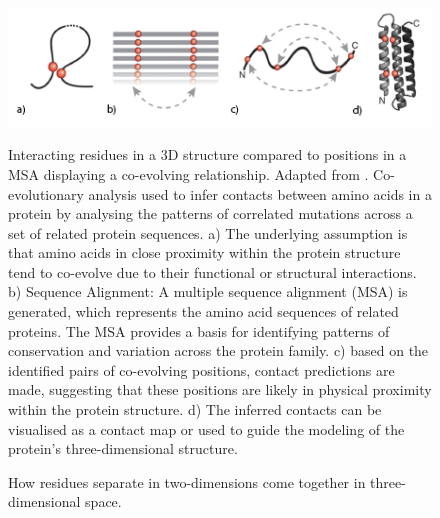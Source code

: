 \begin{figure}[th!]
    \centering
    \includegraphics[width=\textwidth]{introduction/contacts.png}
    \caption{How residues separate in two-dimensions come together in three-dimensional space. }
    \label{fig:contacts}
    \small
    Interacting residues in a 3D structure compared to positions in a MSA displaying a co-evolving relationship. Adapted from \cite{Simkovic2017}.
    Co-evolutionary analysis used to infer contacts between amino acids in a protein by analysing the patterns of correlated mutations across a set of related protein sequences. a) The underlying assumption is that amino acids in close proximity within the protein structure tend to co-evolve due to their functional or structural interactions. b) Sequence Alignment: A multiple sequence alignment (MSA) is generated, which represents the amino acid sequences of related proteins. The MSA provides a basis for identifying patterns of conservation and variation across the protein family. c) based on the identified pairs of co-evolving positions, contact predictions are made, suggesting that these positions are likely in physical proximity within the protein structure. d) The inferred contacts can be visualised as a contact map or used to guide the modeling of the protein's three-dimensional structure.
\end{figure}

